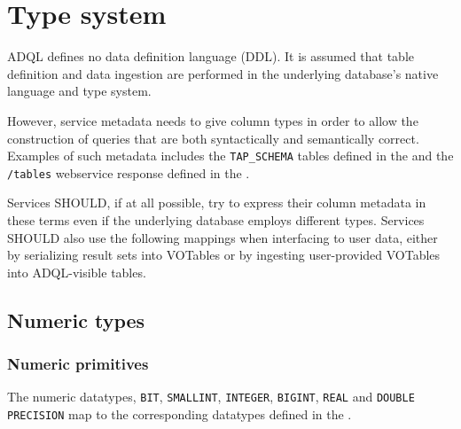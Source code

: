 \documentclass[11pt,a4paper]{ivoa}
\begin{document}
\clearpage %
\section{Type system}
\label{sec:types}

ADQL defines no data definition language (DDL).
It is assumed that table definition and data ingestion are performed in
the underlying database's native language and type system.

However, service metadata needs to give column types in order to allow the
construction of queries that are both syntactically and semantically correct.
Examples of such metadata includes the \verb:TAP_SCHEMA: tables defined
in the \TAPSpec{} and the \verb:/tables:
webservice response defined in the \VOSISpec{}.

Services SHOULD, if at all possible, try to express their column metadata in
these terms even if the underlying database employs different types.
Services SHOULD also use the following mappings when interfacing to user data,
either by serializing result sets into VOTables or by ingesting user-provided
VOTables into ADQL-visible tables.

\subsection{Numeric types}
\label{sec:types.numeric}

\subsubsection{Numeric primitives}
\label{sec:types.numeric.primitive}

The numeric datatypes, \verb:BIT:, \verb:SMALLINT:, \verb:INTEGER:,
\verb:BIGINT:, \verb:REAL:  \linebreak and \verb:DOUBLE PRECISION: map to the
corresponding datatypes defined in the \VOTableSpec{}.
\end{document}
